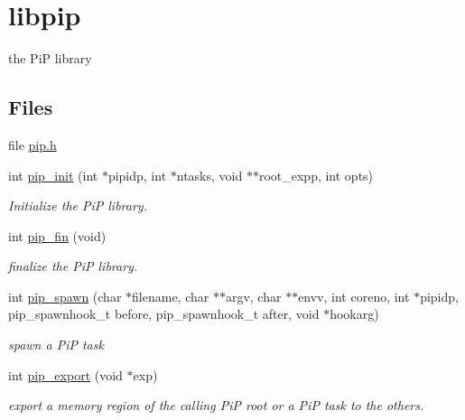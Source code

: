 \hypertarget{group__libpip}{\section{libpip}
\label{group__libpip}
}


the Pi\-P library  


\subsection*{Files}
\begin{DoxyCompactItemize}
\item 
file \hyperlink{pip_8h}{pip.\-h}
\end{DoxyCompactItemize}
\begin{DoxyCompactItemize}
\item 
int \hyperlink{group__libpip_gad4e0db6c69792b3fa014e3310892a0eb}{pip\-\_\-init} (int $\ast$pipidp, int $\ast$ntasks, void $\ast$$\ast$root\-\_\-expp, int opts)
\begin{DoxyCompactList}\small\item\em Initialize the Pi\-P library. \end{DoxyCompactList}\end{DoxyCompactItemize}
\begin{DoxyCompactItemize}
\item 
int \hyperlink{group__libpip_gac4654282785abb9434ce81573fdf16ed}{pip\-\_\-fin} (void)
\begin{DoxyCompactList}\small\item\em finalize the Pi\-P library. \end{DoxyCompactList}\end{DoxyCompactItemize}
\begin{DoxyCompactItemize}
\item 
int \hyperlink{group__libpip_gae9187ea22ecf0623fa3ecfba5337f52d}{pip\-\_\-spawn} (char $\ast$filename, char $\ast$$\ast$argv, char $\ast$$\ast$envv, int coreno, int $\ast$pipidp, pip\-\_\-spawnhook\-\_\-t before, pip\-\_\-spawnhook\-\_\-t after, void $\ast$hookarg)
\begin{DoxyCompactList}\small\item\em spawn a Pi\-P task \end{DoxyCompactList}\end{DoxyCompactItemize}
\begin{DoxyCompactItemize}
\item 
int \hyperlink{group__libpip_ga76ef9337bec7dd836168f22247d4c64c}{pip\-\_\-export} (void $\ast$exp)
\begin{DoxyCompactList}\small\item\em export a memory region of the calling Pi\-P root or a Pi\-P task to the others. \end{DoxyCompactList}\end{DoxyCompactItemize}
